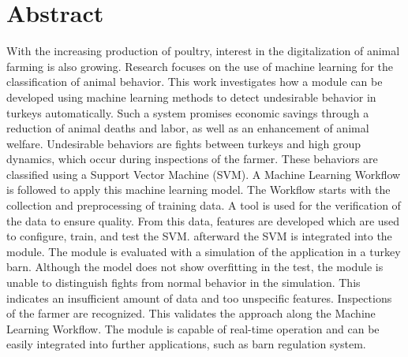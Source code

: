 \section*{Abstract}
With the increasing production of poultry, interest in the digitalization of animal farming is also growing. Research focuses on the use of machine learning for the classification of animal behavior. This work investigates how a module can be developed using machine learning methods to detect undesirable behavior in turkeys automatically. Such a system promises economic savings through a reduction of animal deaths and labor, as well as an enhancement of animal welfare. Undesirable behaviors are fights between turkeys and high group dynamics, which occur during inspections of the farmer. These behaviors are classified using a Support Vector Machine (SVM). A Machine Learning Workflow is followed to apply this machine learning model. The Workflow starts with the collection and preprocessing of training data. A tool is used for the verification of the data to ensure quality. From this data, features are developed which are used to  configure, train, and test the SVM. afterward the SVM is integrated into the module. The module is evaluated with a simulation of the application in a turkey barn. Although the model does not show overfitting in the test, the module is unable to distinguish fights from normal behavior in the simulation. This indicates an insufficient amount of data and too unspecific features. Inspections of the farmer are recognized. This validates the approach along the Machine Learning Workflow. The module is capable of real-time operation and can be easily integrated into further applications, such as barn regulation system.
